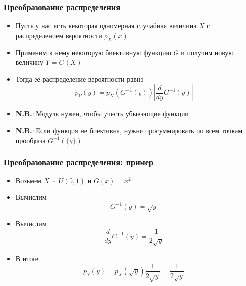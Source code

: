 \documentclass[handout,10pt]{beamer}
\begin{document}
\begin{frame}[fragile]
\frametitle{Преобразование распределения}
\begin{itemize}
\item Пусть у нас есть некоторая одномерная случайная величина \begin{math}X\end{math} с распределением вероятности \begin{math}p_X(x)\end{math}
\pause
\item Применим к нему некоторую биективную функцию \begin{math}G\end{math} и получим новую величину \begin{math}Y = G(X)\end{math}
\pause
\item Тогда её распределение вероятности равно
\begin{equation*}
p_Y(y) = p_X(G^{-1}(y))\left|\frac{d}{dy}G^{-1}(y)\right|
\end{equation*}
\pause
\item \alert{\textbf{N.B.}}: Модуль нужен, чтобы учесть убывающие функции
\pause
\item \alert{\textbf{N.B.}}: Если функция не биективна, нужно просуммировать по всем точкам прообраза \begin{math}G^{-1}(\{y\})\end{math}
\end{itemize}
\end{frame}

\begin{frame}[fragile]
\frametitle{Преобразование распределения: пример}
\begin{itemize}
\item Возьмём \begin{math}X\sim U(0,1)\end{math} и \begin{math}G(x) = x^2\end{math}
\pause
\item Вычислим \begin{equation*}G^{-1}(y) = \sqrt y\end{equation*}
\pause
\item Вычислим \begin{equation*}\frac{d}{dy}G^{-1}(y) = \frac{1}{2\sqrt y}\end{equation*}
\pause
\item В итоге \begin{equation*}p_Y(y) = p_X(\sqrt y)\frac{1}{2\sqrt y} = \frac{1}{2\sqrt y}\end{equation*}
\end{itemize}
\end{frame}
\end{document}
